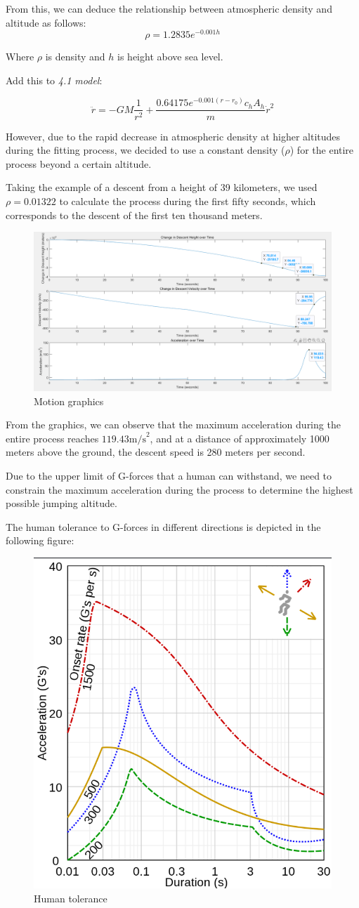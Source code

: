\documentclass[12pt]{article}
\begin{document}
From this, we can deduce the relationship between atmospheric density and altitude as follows:
\[ \rho = 1.2835e^{-0.001h}\]

Where $\rho $ is density and $h$ is height above sea level.

Add this to \textit{4.1 model}:

\[ \ddot{r} = - GM\frac{1}{r^2} + \frac{0.64175e^{-0.001(r - r_0)} c_h A_h}{m}\dot{r}^2\]

However, due to the rapid decrease in atmospheric density at higher altitudes during 
the fitting process, we decided to 
use a constant density (\( \rho \)) for the entire process beyond a certain altitude.

Taking the example of a descent from a height of 39 kilometers, we used 
\( \rho = 0.01322 \) to calculate the process during the first 
fifty seconds, which corresponds to the descent of the first ten thousand meters.

\begin{figure}[!hbtp]
    \centering 
    \includegraphics[width = 0.6\linewidth]{image/011.png}
    \caption{Motion graphics}
\end{figure}

From the graphics, we can observe that the maximum acceleration during the entire 
process reaches $119.43 \text{m/s}^2$, and at a distance of approximately 1000 meters above the ground, the descent speed is  
280 meters per second.

Due to the upper limit of G-forces that a human can withstand, 
we need to constrain the maximum acceleration during the process 
to determine the highest possible jumping altitude.

The human tolerance to G-forces in different directions is depicted in the following figure\cite{enwiki:1183575400}:
\begin{figure}[!hbtp]
    \centering 
    \includegraphics[width = 0.3\linewidth]{image/012.png}
    \caption{Human tolerance}
\end{figure}
\end{document}
